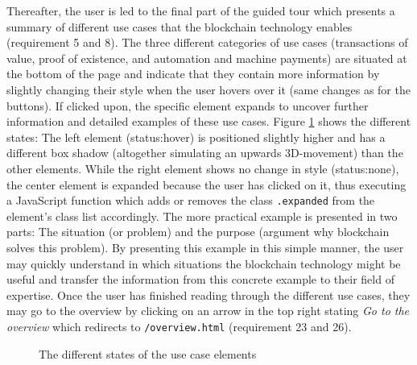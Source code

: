 Thereafter, the user is led to the final part of the guided tour which presents a summary of different use cases that the blockchain technology enables (requirement 5 and 8). The three different categories of use cases (transactions of value, proof of existence, and automation and machine payments) are situated at the bottom of the page and indicate that they contain more information by slightly changing their style when the user hovers over it (same changes as for the buttons). If clicked upon, the specific element expands to uncover further information and detailed examples of these use cases. Figure \ref{fig:AnimUC} shows the different states: The left element (status:hover) is positioned slightly higher and has a different box shadow (altogether simulating an upwards 3D-movement) than the other elements. While the right element shows no change in style (status:none), the center element is expanded because the user has clicked on it, thus executing a JavaScript function which adds or removes the class \texttt{.expanded} from the element's class list accordingly. The more practical example is presented in two parts: The situation (or problem) and the purpose (argument why blockchain solves this problem). By presenting this example in this simple manner, the user may quickly understand in which situations the blockchain technology might be useful and transfer the information from this concrete example to their field of expertise. Once the user has finished reading through the different use cases, they may go to the overview by clicking on an arrow in the top right stating \textit{Go to the overview} which redirects to \texttt{/overview.html} (requirement 23 and 26). 

\begin{figure}
    \centering
    
    \caption{The different states of the use case elements}
    \label{fig:AnimUC}
\end{figure}



